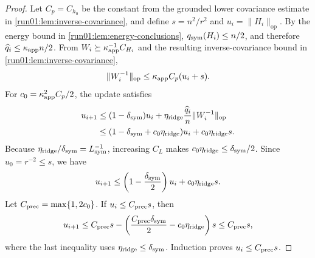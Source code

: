 \documentclass[11pt]{article}
\numberwithin{equation}{section}
\theoremstyle{definition}
\begin{document}
\begin{proof}
Let $C_p=C_{h_0}$ be the constant from the grounded lower covariance estimate in
\cref{run01:lem:inverse-covariance}, and define
$s=n^2/r^2$ and
$u_i=\|H_i\|_{\mathrm{op}}$.
By the energy bound in \cref{run01:lem:energy-conclusions},
$q_{\rm sym}(H_i)\leq n/2$, and therefore
$\widehat q_i\leq\kappa_{\rm app}n/2$.
From $W_i\succeq\kappa_{\rm app}^{-1}C_{H_i}$ and the resulting
inverse-covariance bound in \cref{run01:lem:inverse-covariance},
\[
 \|W_i^{-1}\|_{\mathrm{op}}
 \leq\kappa_{\rm app}C_p(u_i+s).
\]
For $c_0=\kappa_{\rm app}^2C_p/2$, the update satisfies
\[
 \begin{aligned}
 u_{i+1}
 &\leq(1-\delta_{\rm sym})u_i
 +\eta_{\rm ridge}\frac{\widehat q_i}{n}
   \|W_i^{-1}\|_{\rm op}\\
 &\leq(1-\delta_{\rm sym}+c_0\eta_{\rm ridge})u_i
 +c_0\eta_{\rm ridge}s.
 \end{aligned}
\]
Because $\eta_{\rm ridge}/\delta_{\rm sym}=L_{\rm sym}^{-1}$, increasing
$C_L$ makes
$c_0\eta_{\rm ridge}\leq\delta_{\rm sym}/2$.
Since $u_0=r^{-2}\leq s$, we have
\[
 u_{i+1}\leq
 \left(1-\frac{\delta_{\rm sym}}2\right)u_i
 +c_0\eta_{\rm ridge}s.
\]
Let $C_{\rm prec}=\max\{1,2c_0\}$.
If $u_i\leq C_{\rm prec}s$, then
\[
u_{i+1}
\leq C_{\rm prec}s -\left(\frac{C_{\rm prec}\delta_{\rm sym}}2 -c_0\eta_{\rm ridge}\right)s
\leq C_{\rm prec}s,
\]
where the last inequality uses $\eta_{\rm ridge}\leq\delta_{\rm sym}$.
Induction proves $u_i\leq C_{\rm prec}s$.


\end{proof}
\end{document}
